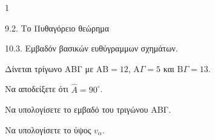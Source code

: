 \begin{ylh}{1}
    \item 9.2. Το Πυθαγόρειο θεώρημα
    \item 10.3. Εμβαδόν βασικών ευθύγραμμων σχημάτων.
\end{ylh}
\begin{figure} %
    \centering
\end{figure}
\noindent Δίνεται τρίγωνο ΑΒΓ με $\mathrm{AB} = 12$, $\mathrm{A}\Gamma = 5$ και $\mathrm{B}\Gamma = 13$.
\begin{alist}
    \item Να αποδείξετε ότι $\widehat{A} = 90^\circ$. 
    \item Να υπολογίσετε το εμβαδό του τριγώνου ΑΒΓ. 
    \item Να υπολογίσετε το ύψος $v_\alpha$. 
\end{alist}